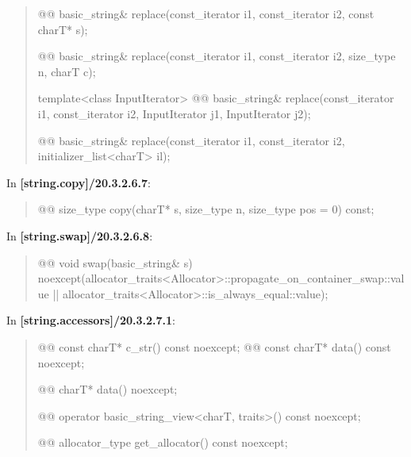 \documentclass{wg21}
\begin{document}
\begin{quote}
\begin{itemdecl}
@@
basic_string& replace(const_iterator i1, const_iterator i2, const charT* s);
\end{itemdecl}

\begin{itemdecl}
@@
basic_string& replace(const_iterator i1, const_iterator i2, size_type n, charT c);
\end{itemdecl}

\begin{itemdecl}
template<class InputIterator>
  @@
  basic_string& replace(const_iterator i1, const_iterator i2, InputIterator j1, InputIterator j2);
\end{itemdecl}

\begin{itemdecl}
@@
basic_string& replace(const_iterator i1, const_iterator i2, initializer_list<charT> il);
\end{itemdecl}
\end{quote}

In \textbf{[string.copy]/20.3.2.6.7}:
\begin{quote}
\begin{itemdecl}
@@ size_type copy(charT* s, size_type n, size_type pos = 0) const;
\end{itemdecl}
\end{quote}

In \textbf{[string.swap]/20.3.2.6.8}:
\begin{quote}
\begin{itemdecl}
@@
void swap(basic_string& s)
  noexcept(allocator_traits<Allocator>::propagate_on_container_swap::value ||
           allocator_traits<Allocator>::is_always_equal::value);
\end{itemdecl}
\end{quote}


In \textbf{[string.accessors]/20.3.2.7.1}:
\begin{quote}
\begin{itemdecl}
@@ const charT* c_str() const noexcept;
@@ const charT* data() const noexcept;
\end{itemdecl}

\begin{itemdecl}
@@ charT* data() noexcept;
\end{itemdecl}

\begin{itemdecl}
@@ operator basic_string_view<charT, traits>() const noexcept;
\end{itemdecl}

\begin{itemdecl}
@@ allocator_type get_allocator() const noexcept;
\end{itemdecl}
\end{quote}
\end{document}
